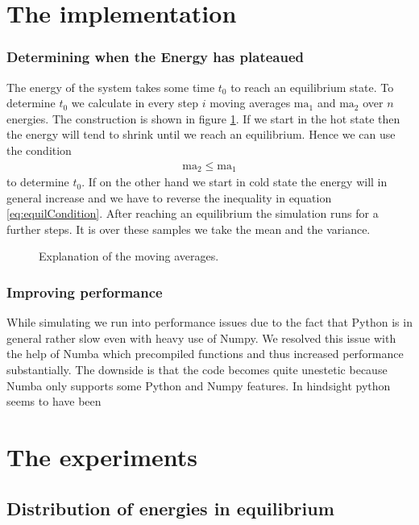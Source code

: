 \section{The implementation}

\subsubsection{Determining when the Energy has plateaued}

The energy of the system takes some time $t_0$ to reach an equilibrium state. To determine $t_0$ we calculate in every step $i$ moving averages $\text{ma}_1$ and $\text{ma}_2$ over $n$ energies. The construction is shown in figure \ref{fi:movingAverages}. If we start in the hot state then the energy will tend to shrink until we reach an equilibrium. Hence we can use the condition
\begin{align}
	\text{ma}_2 \leq \text{ma}_1 \label{eq:equilCondition}
\end{align}
to determine $t_0$. If on the other hand we start in cold state the energy will in general increase and we have to reverse the inequality in equation \eqref{eq:equilCondition}. After reaching an equilibrium the simulation runs for a further  steps. It is over these samples we take the mean and the variance.

\begin{figure}
\centering

\caption{Explanation of the moving averages.}
\label{fi:movingAverages}
\end{figure}

\subsubsection{Improving performance}
While simulating we run into performance issues due to the fact that Python is in general rather slow even with heavy use of Numpy. We resolved this issue with the help of Numba which precompiled functions and thus increased performance substantially. The downside is that the code becomes quite unestetic because Numba only supports some Python and Numpy features. In hindsight python seems to have been 

\section{The experiments}

\subsection{Distribution of energies in equilibrium}

